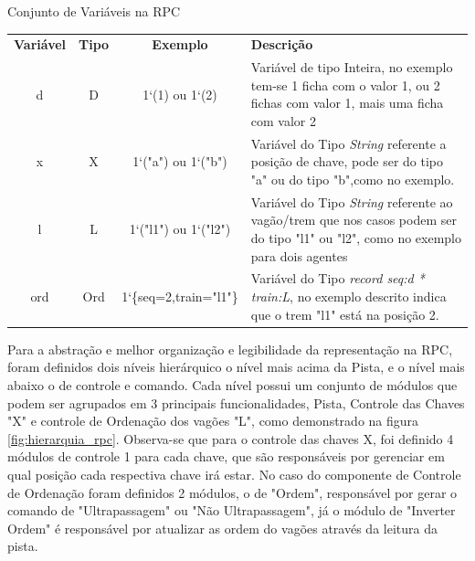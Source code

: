 \begin{quadro}[ht]
\caption{Conjunto de Variáveis na RPC}
\begin{tabularx}{\textwidth}{|c|c|c|X|}
\cline{1-4}
\textbf{Variável} & \textbf{Tipo} & \textbf{Exemplo} & \textbf{Descrição} \\ 
\cline{1-4} %
d & D & 1`(1) ou 1`(2) & Variável de tipo Inteira, no exemplo tem-se 1 ficha com o valor 1, ou 2 fichas com valor 1, mais uma ficha com valor 2 \\ \cline{1-4} %
x & X & 1`("a") ou 1`("b") & Variável do Tipo \textit{String} referente a posição de chave, pode ser do tipo "a" ou do tipo "b",como no exemplo. \\ \cline{1-4} %
l & L & 1`("l1") ou 1`("l2") & Variável do Tipo \textit{String} referente ao vagão/trem que nos casos podem ser do tipo "l1" ou "l2", como no exemplo para dois agentes \\ \cline{1-4} %
ord & Ord & 1`\{seq=2,train="l1"\} & Variável do Tipo \textit{record seq:d * train:L}, no exemplo descrito indica que o trem "l1" está na posição 2. \\ \cline{1-4} 
\end{tabularx}
\label{qua:variaveis_rpc}
\end{quadro}

Para a abstração e melhor organização e legibilidade da representação na RPC, foram definidos dois níveis hierárquico o nível mais acima da Pista, e o nível mais abaixo o de controle e comando. Cada nível possui um conjunto de módulos que podem ser agrupados em 3 principais funcionalidades, Pista, Controle das Chaves "X" e controle de Ordenação dos vagões "L", como demonstrado na figura \ref{fig:hierarquia_rpc}. Observa-se que para o controle das chaves X, foi definido 4 módulos de controle 1 para cada chave, que são responsáveis por gerenciar em qual posição cada respectiva chave irá estar. No caso do componente de Controle de Ordenação foram definidos 2 módulos, o de "Ordem", responsável por gerar o comando de "Ultrapassagem" ou "Não Ultrapassagem", já o módulo de "Inverter Ordem" é responsável por atualizar as ordem do vagões através da leitura da pista.

